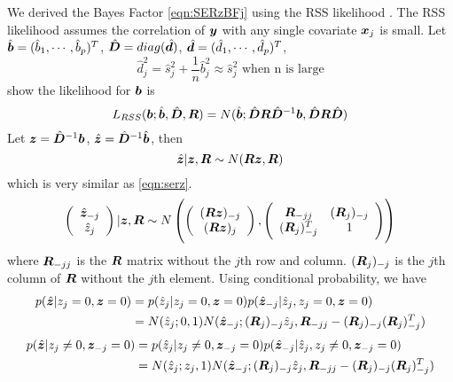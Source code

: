 We derived the Bayes Factor \eqref{eqn:SERzBFj} using the RSS likelihood \citep{zhu2017bayesian}. The RSS likelihood assumes the correlation of $\bm y$ with any single covariate $\bm x_j$ is small. Let $\hat{\bm b} = (\hat{b}_1, \cdots, \hat{b}_p)^T$, $\hat {\bm D} = diag(\hat {\bm d})$, $\hat {\bm d} = (\hat{d}_1, \cdots, \hat{d}_p)^T$, 
\begin{equation}
    \hat{d}_j^2 = \hat{s}_j^2 + \frac{1}{n} \hat{b}_j^2 \approx \hat{s}_j^2 \text{ when n is large}
\end{equation}
\cite{zhu2017bayesian} show the likelihood for $\bm b$ is
\begin{equation}
    L_{RSS}(\bm b; \hat{\bm b}, \hat {\bm D}, \bm R) = N(\hat{\bm b}; \hat {\bm D} \bm R \hat {\bm D}^{-1}\bm b, \hat {\bm D} \bm R \hat {\bm D})
\end{equation}
Let $\bm z = \hat {\bm D}^{-1}\bm b$, $\hat {\bm z} = \hat {\bm D}^{-1}\hat{\bm b}$, then
\begin{equation}
    \hat {\bm z} | \bm z, \bm R \sim N(\bm R \bm z, \bm R)
\end{equation}
which is very similar as \eqref{eqn:serz}.
\begin{equation}
    \left(\begin{array}{c}
        \hat{\bm z}_{-j}  \\
        \hat{z}_j 
    \end{array}\right) | \bm z, \bm R \sim N\left(\left(\begin{array}{c}
        (\bm R\bm z)_{-j}  \\
        (\bm R\bm z)_{j}
    \end{array}\right), \left(\begin{array}{cc}
        \bm R_{-jj} & (\bm R_{j})_{-j} \\
        (\bm R_{j})_{-j}^{T} & 1
    \end{array} \right) \right)
\end{equation}
where $\bm R_{-jj}$ is the $\bm R$ matrix without the $j$th row and column. $(\bm R_{j})_{-j}$ is the $j$th column of $\bm R$ without the $j$th element. Using conditional probability, we have
\begin{align}
    p(\hat {\bm z}|z_j=0, \bm z = 0) &= p(\hat{z}_j | z_j=0, \bm z = 0) p(\hat{\bm z}_{-j}| \hat{z}_j,  z_j=0, \bm z = 0) \\
    &= N(\hat{z}_j; 0,1)N(\hat{\bm z}_{-j}; (\bm R_{j})_{-j} \hat{z}_j, \bm R_{-jj} - (\bm R_{j})_{-j} (\bm R_{j})_{-j}^{T})
\end{align}
\begin{align}
    p(\hat {\bm z}|z_j\neq0, \bm z_{-j} = 0) &= p(\hat{z}_j | z_j\neq0, \bm z_{-j} = 0) p(\hat{\bm z}_{-j}| \hat{z}_j,  z_j\neq0, \bm z_{-j} = 0) \\
    &= N(\hat{z}_j; z_j,1)N(\hat{\bm z}_{-j}; (\bm R_{j})_{-j} \hat{z}_j, \bm R_{-jj} - (\bm R_{j})_{-j} (\bm R_{j})_{-j}^{T})
\end{align}
